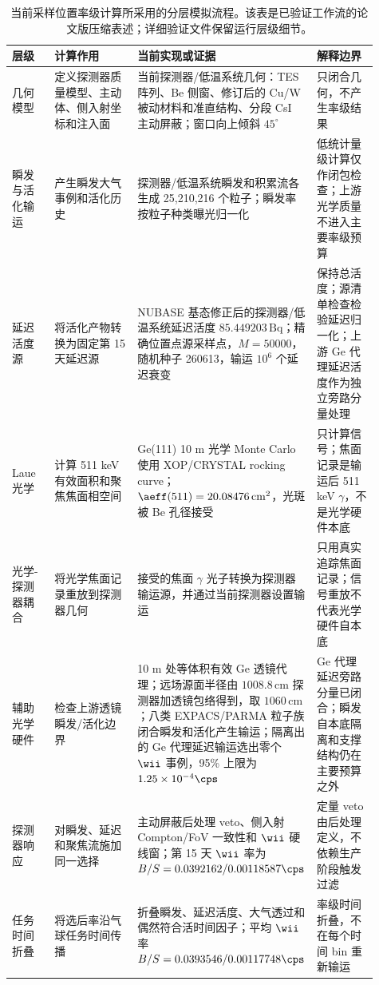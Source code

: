 \begin{table}[t]
\centering
\caption{当前采样位置率级计算所采用的分层模拟流程。该表是已验证工作流的论文版压缩表述；详细验证文件保留运行层级细节。}
\label{tab:simulation_workflow}
\begingroup
\setlength{\tabcolsep}{2pt}
\renewcommand{\arraystretch}{0.78}
\tiny
\begin{tabular}{@{}p{0.12\linewidth}p{0.25\linewidth}p{0.36\linewidth}p{0.18\linewidth}@{}}
\toprule
层级 & 计算作用 & 当前实现或证据 & 解释边界 \\
\midrule
几何模型 & 定义探测器质量模型、主动体、侧入射坐标和注入面 & 当前探测器/低温系统几何：TES 阵列、Be 侧窗、修订后的 Cu/W 被动材料和准直结构、分段 CsI 主动屏蔽；窗口向上倾斜 $45^\circ$ & 只闭合几何，不产生率级结果 \\
瞬发与活化输运 & 产生瞬发大气事例和活化历史 & 探测器/低温系统瞬发和积累流各生成 25,210,216 个粒子；瞬发率按粒子种类曝光归一化 & 低统计量级计算仅作闭包检查；上游光学质量不进入主要率级预算 \\
延迟活度源 & 将活化产物转换为固定第 15 天延迟源 & NUBASE 基态修正后的探测器/低温系统延迟活度 $85.449203\,\mathrm{Bq}$；精确位置点源采样点，$M=50000$，随机种子 260613，输运 $10^6$ 个延迟衰变 & 保持总活度；源清单检查检验延迟归一化；上游 Ge 代理延迟活度作为独立旁路分量处理 \\
Laue 光学 & 计算 511 keV 有效面积和聚焦焦面相空间 & Ge(111) 10 m 光学 Monte Carlo 使用 XOP/CRYSTAL rocking curve；$\aeff(511)=20.08476\,\mathrm{cm^2}$，光斑被 Be 孔径接受 & 只计算信号；焦面记录是输运后 511 keV $\gamma$，不是光学硬件本底 \\
光学-探测器耦合 & 将光学焦面记录重放到探测器几何 & 接受的焦面 $\gamma$ 光子转换为探测器输运源，并通过当前探测器设置输运 & 只用真实追踪焦面记录；信号重放不代表光学硬件自本底 \\
辅助光学硬件 & 检查上游透镜瞬发/活化边界 & 10 m 处等体积有效 Ge 透镜代理；远场源面半径由 $1008.8\,\mathrm{cm}$ 探测器加透镜包络得到，取 $1060\,\mathrm{cm}$；八类 EXPACS/PARMA 粒子族闭合瞬发和活化产生输运；隔离出的 Ge 代理延迟输运选出零个 $\wii$ 事例，95\% 上限为 $1.25\times10^{-4}\cps$ & Ge 代理延迟旁路分量已闭合；瞬发自本底隔离和支撑结构仍在主要预算之外 \\
探测器响应 & 对瞬发、延迟和聚焦流施加同一选择 & 主动屏蔽后处理 veto、侧入射 Compton/FoV 一致性和 $\wii$ 硬线窗；第 15 天 $\wii$ 率为 $B/S=0.0392162/0.00118587\cps$ & 定量 veto 由后处理定义，不依赖生产阶段触发过滤 \\
任务时间折叠 & 将选后率沿气球任务时间传播 & 折叠瞬发、延迟活度、大气透过和偶然符合活时间因子；平均 $\wii$ 率 $B/S=0.0393546/0.00117748\cps$ & 率级时间折叠，不在每个时间 bin 重新输运 \\

\end{tabular}
\end{table}
